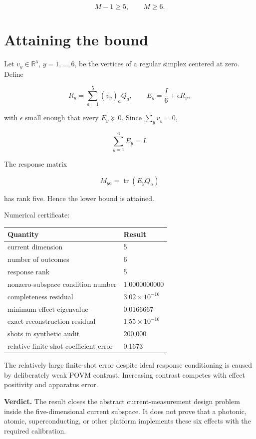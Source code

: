 \documentclass[11pt,a4paper,openany]{report}
\begin{document}
\[
M-1\ge5,\qquad M\ge6.
\]

\section{Attaining the bound}

Let \(v_y\in\mathbb R^5\), \(y=1,\ldots,6\), be the vertices of a regular simplex centered at zero. Define

\[
R_y=\sum_{a=1}^{5}(v_y)_aQ_a,
\qquad
E_y=\frac{I}{6}+\epsilon R_y,
\]

with \(\epsilon\) small enough that every \(E_y\succeq0\). Since \(\sum_yv_y=0\),

\[
\sum_{y=1}^{6}E_y=I.
\]

The response matrix

\[
M_{ya}=\operatorname{tr}(E_yQ_a)
\]

has rank five. Hence the lower bound is attained.

Numerical certificate:

\begin{center}
\begingroup\small
\setlength{\tabcolsep}{2.5pt}
\renewcommand{\arraystretch}{1.16}
\begin{longtable}{@{}p{}p{}@{}}
\toprule
\textbf{Quantity} & \textbf{Result} \\
\midrule
\endhead
current dimension & 5 \\
number of outcomes & 6 \\
response rank & 5 \\
nonzero-subspace condition number & 1.0000000000 \\
completeness residual & \(3.02\times10^{-16}\) \\
minimum effect eigenvalue & 0.0166667 \\
exact reconstruction residual & \(1.55\times10^{-16}\) \\
shots in synthetic audit & 200,000 \\
relative finite-shot coefficient error & 0.1673 \\
\bottomrule
\end{longtable}
\endgroup
\end{center}

The relatively large finite-shot error despite ideal response conditioning is caused by deliberately weak POVM contrast. Increasing contrast competes with effect positivity and apparatus error.

\textbf{Verdict.} The result closes the abstract current-measurement design problem inside the five-dimensional current subspace. It does not prove that a photonic, atomic, superconducting, or other platform implements these six effects with the required calibration.
\end{document}
